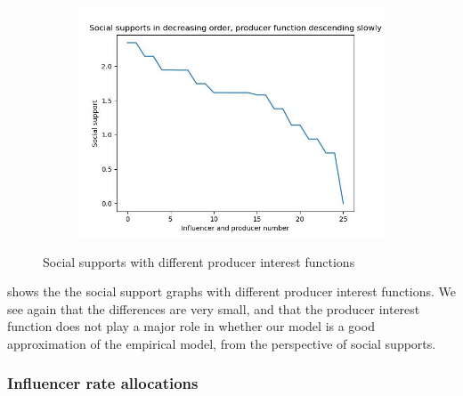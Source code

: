 \documentclass[11pt, letterpaper]{article}
\begin{document}
\begin{figure}[h]
\begin{adjustbox}{max width=1.5\textwidth,center}
\begin{subfigure}[b]{0.45\textwidth}
        \includegraphics[width=\linewidth]{"figures/g/descending slowly_supps.jpg"}
    \end{subfigure}
\end{adjustbox}
\caption{Social supports with different producer interest functions}
\label{fig:g_supps}
\end{figure}

 shows the the social support graphs with different producer interest functions. We see again that the differences are very small, and that the producer interest function does not play a major role in whether our model is a good approximation of the empirical model, from the perspective of social supports.

\subsubsection{Influencer rate allocations}
\end{document}
